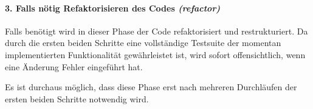 \paragraph{3. Falls nötig Refaktorisieren des Codes \textit{(refactor)}}
Falls benötigt wird in dieser Phase der Code refaktorisiert und restrukturiert. Da durch die ersten beiden Schritte eine vollständige Testsuite der momentan implementierten Funktionalität gewährleistet ist, wird sofort offensichtlich, wenn eine Änderung Fehler eingeführt hat.

Es ist durchaus möglich, dass diese Phase erst nach mehreren Durchläufen der ersten beiden Schritte notwendig wird. 
